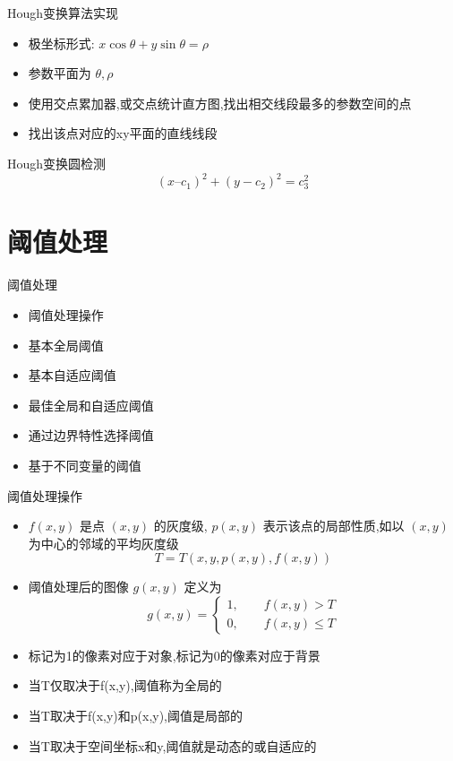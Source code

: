\documentclass[presentation]{beamer}
\begin{document}
\begin{frame}[label={sec:orgabda79b}]{Hough变换算法实现}
\begin{itemize}
\item 极坐标形式: \(x\cos\theta+y\sin\theta=\rho\)
\item 参数平面为 \(\theta,\rho\)
\item 使用交点累加器,或交点统计直方图,找出相交线段最多的参数空间的点
\item 找出该点对应的xy平面的直线线段
\end{itemize}
\end{frame}

\begin{frame}[label={sec:org2fe5755}]{Hough变换圆检测}
\[(x–c_1)^2 + (y - c_2)^2 = c_3^2\]
\end{frame}

\section{阈值处理}
\label{sec:org402e1a8}
\begin{frame}[label={sec:orgba93d09}]{阈值处理}
\begin{itemize}
\item 阈值处理操作
\item 基本全局阈值
\item 基本自适应阈值
\item 最佳全局和自适应阈值
\item 通过边界特性选择阈值
\item 基于不同变量的阈值
\end{itemize}
\end{frame}
\begin{frame}[label={sec:org6193915}]{阈值处理操作}
\begin{itemize}
\item \(f(x,y)\) 是点 \((x,y)\) 的灰度级, \(p(x,y)\) 表示该点的局部性质,如以 \((x,y)\) 为中心的邻域的平均灰度级
\[ T= T(x,y,p(x,y),f(x,y)) \]
\item 阈值处理后的图像 \(g(x,y)\) 定义为
\[ g(x,y)=\begin{cases}1, \qquad f(x,y)>T \\  0, \qquad f(x,y)\leq T \end{cases} \]
\item 标记为1的像素对应于对象,标记为0的像素对应于背景
\item 当T仅取决于f(x,y),阈值称为全局的
\item 当T取决于f(x,y)和p(x,y),阈值是局部的
\item 当T取决于空间坐标x和y,阈值就是动态的或自适应的
\end{itemize}
\end{frame}
\end{document}
